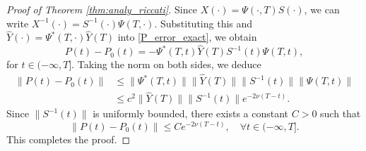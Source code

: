 \documentclass[10pt,a4paper]{amsart}
\begin{document}
\begin{proof}[Proof of Theorem \ref{thm:analy_riccati}]
		Since $X(\cdot) = \Psi(\cdot,T)S(\cdot)$, we can write $X^{-1}(\cdot) = S^{-1}(\cdot)\Psi(T,\cdot)$. Substituting this and $\hat{Y}(\cdot) = \Psi^*(T,\cdot)\hat{Y}(T)$ into \eqref{P_error_exact}, we obtain
		\begin{equation}
			P(t) - P_0(t) = -\Psi^*(T,t)\hat{Y}(T) S^{-1}(t) \Psi(T,t),
		\end{equation}for $t\in(-\infty,T]$.
		Taking the norm on both sides, we deduce
		\begin{equation}
			\begin{split}
				\|P(t) - P_0(t)\| &\leq \|\Psi^*(T,t)\| \|\hat{Y}(T)\| \|S^{-1}(t)\| \|\Psi(T,t)\| \\
				&\leq c^2 \|\hat{Y}(T)\| \|S^{-1}(t)\| e^{-2\nu(T-t)}.
			\end{split}
		\end{equation}
		Since $\|S^{-1}(t)\|$ is uniformly bounded, there exists a constant $C > 0$ such that
		\begin{equation}
			\|P(t) - P_0(t)\| \leq C e^{-2\nu(T-t)}, \quad \forall t \in (-\infty, T].
		\end{equation}
		This completes the proof.
	\end{proof}
\end{document}
